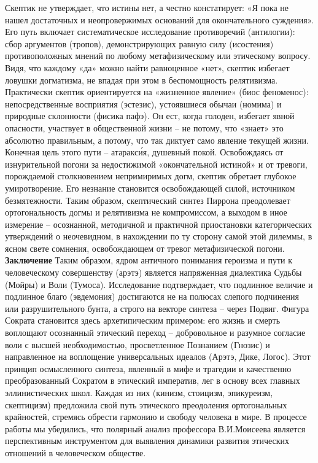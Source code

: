     Скептик не утверждает, что истины нет, а честно констатирует: «Я пока не нашел достаточных и неопровержимых оснований для окончательного суждения». Его путь включает систематическое исследование противоречий (антилогии): сбор аргументов (тропов), демонстрирующих равную силу (исостения) противоположных мнений по любому метафизическому или этическому вопросу. Видя, что каждому «да» можно найти равноценное «нет», скептик избегает ловушки догматизма, не впадая при этом в беспомощность релятивизма.
    Практически скептик ориентируется на «жизненное явление» (биос феноменос): непосредственные восприятия (эстезис), устоявшиеся обычаи (номима) и природные склонности (фисика пафэ). Он ест, когда голоден, избегает явной опасности, участвует в общественной жизни – не потому, что «знает» это абсолютно правильным, а потому, что так диктует само явление текущей жизни. Конечная цель этого пути – атаракси́я, душевный покой. Освобождаясь от изнурительной погони за недостижимой «окончательной истиной» и от тревоги, порождаемой столкновением непримиримых догм, скептик обретает глубокое умиротворение. Его незнание становится освобождающей силой, источником безмятежности.
    Таким образом, скептический синтез Пиррона преодолевает ортогональность догмы и релятивизма не компромиссом, а выходом в иное измерение – осознанной, методичной и практичной приостановки категорических утверждений о неочевидном, в нахождении по ту сторону самой этой дилеммы, в ясном свете сомнения, освобождающем от тревог метафизической погони.
    \textbf{Заключение}
    Таким образом, ядром античного понимания героизма и пути к человеческому совершенству (арэтэ) является напряженная диалектика Судьбы (Мойры) и Воли (Тумоса). Исследование подтверждает, что подлинное величие и подлинное благо (эвдемония) достигаются не на полюсах слепого подчинения или разрушительного бунта, а строго на векторе синтеза – через Подвиг. Фигура Сократа становится здесь архетипическим примером: его жизнь и смерть воплощают осознанный этический переход – добровольное и разумное согласие воли с высшей необходимостью, просветленное Познанием (Гнозис) и направленное на воплощение универсальных идеалов (Арэтэ, Дике, Логос). Этот принцип осмысленного синтеза, явленный в мифе и трагедии и качественно преобразованный Сократом в этический императив, лег в основу всех главных эллинистических школ. Каждая из них (кинизм, стоицизм, эпикуреизм, скептицизм) предложила свой путь этического преодоления ортогональных крайностей, стремясь обрести гармонию и свободу человека в мире. В процессе работы мы убедились, что полярный анализ профессора В.И.Моисеева является перспективным инструментом для выявления динамики развития этических отношений в человеческом обществе.

